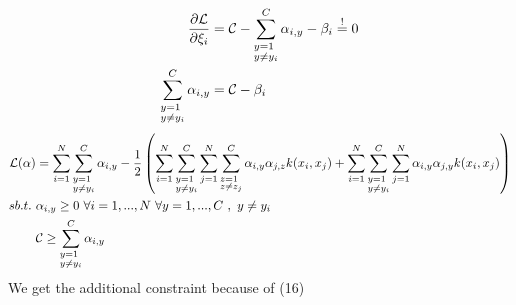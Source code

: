 \begin{align}
	\frac{\partial \mathcal{L}}{\partial \xi_i} &= \mathcal{C} - \sum_{\begin{subarray}{l} y=1 \\ y\neq y_i \end{subarray}}^C \alpha_{i,y} - \beta_i \stackrel{!}{=} 0 \\
	\sum_{\begin{subarray}{l} y=1 \\ y\neq y_i \end{subarray}}^C \alpha_{i,y} &= \mathcal{C} -\beta_i
\end{align}
\begin{align}
	\mathcal{L}(\alpha) &= \sum_{i=1}^N \sum_{\begin{subarray}{l} y=1 \\ y\neq y_i \end{subarray}}^C \alpha_{i,y} -\frac{1}{2}\left( \sum_{i=1}^N \sum_{\begin{subarray}{l} y=1 \\ y\neq y_i \end{subarray}}^C 
		\sum_{j=1}^N \sum_{\begin{subarray}{l} z=1 \\ z\neq z_j \end{subarray}}^C 
	   \alpha_{i,y} \alpha_{j,z} k(x_i,x_j)
	 +\sum_{i=1}^N \sum_{\begin{subarray}{l} y=1 \\ y\neq y_i \end{subarray}}^C 
	\sum_{j=1}^N 
	   \alpha_{i,y} \alpha_{j,y} k(x_i,x_j) 
	  \right)\\
   sb.t. ~ &\alpha_{i,y} \geq 0 ~ \forall i = 1,...,N ~ \forall y = 1,...,C ~ ,~ y\neq y_i\notag \\
	&\mathcal{C} \geq \sum_{\begin{subarray}{l} y=1 \\ y\neq y_i \end{subarray}}^C \alpha_{i,y} \notag
\end{align}
We get the additional constraint because of (16)

